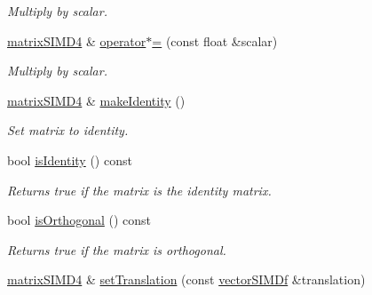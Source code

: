 \begin{DoxyCompactItemize}
\begin{DoxyCompactList}\small\item\em Multiply by scalar. \end{DoxyCompactList}\item 
\hyperlink{classirr_1_1core_1_1matrixSIMD4}{matrix\+S\+I\+M\+D4} \& \hyperlink{classirr_1_1core_1_1matrixSIMD4_a8bee50b9d35327373753850a19047e08}{operator$\ast$=} (const float \&scalar)\hypertarget{classirr_1_1core_1_1matrixSIMD4_a8bee50b9d35327373753850a19047e08}{}\label{classirr_1_1core_1_1matrixSIMD4_a8bee50b9d35327373753850a19047e08}

\begin{DoxyCompactList}\small\item\em Multiply by scalar. \end{DoxyCompactList}\item 
\hyperlink{classirr_1_1core_1_1matrixSIMD4}{matrix\+S\+I\+M\+D4} \& \hyperlink{classirr_1_1core_1_1matrixSIMD4_a9a70b8688d86cb8b872cf1a940283632}{make\+Identity} ()\hypertarget{classirr_1_1core_1_1matrixSIMD4_a9a70b8688d86cb8b872cf1a940283632}{}\label{classirr_1_1core_1_1matrixSIMD4_a9a70b8688d86cb8b872cf1a940283632}

\begin{DoxyCompactList}\small\item\em Set matrix to identity. \end{DoxyCompactList}\item 
bool \hyperlink{classirr_1_1core_1_1matrixSIMD4_a5ec67c604259aadff0a1136310b3859d}{is\+Identity} () const \hypertarget{classirr_1_1core_1_1matrixSIMD4_a5ec67c604259aadff0a1136310b3859d}{}\label{classirr_1_1core_1_1matrixSIMD4_a5ec67c604259aadff0a1136310b3859d}

\begin{DoxyCompactList}\small\item\em Returns true if the matrix is the identity matrix. \end{DoxyCompactList}\item 
bool \hyperlink{classirr_1_1core_1_1matrixSIMD4_a2b22bb3abb4facdd7ba0cd88271332b2}{is\+Orthogonal} () const \hypertarget{classirr_1_1core_1_1matrixSIMD4_a2b22bb3abb4facdd7ba0cd88271332b2}{}\label{classirr_1_1core_1_1matrixSIMD4_a2b22bb3abb4facdd7ba0cd88271332b2}

\begin{DoxyCompactList}\small\item\em Returns true if the matrix is orthogonal. \end{DoxyCompactList}\item 
\hyperlink{classirr_1_1core_1_1matrixSIMD4}{matrix\+S\+I\+M\+D4} \& \hyperlink{classirr_1_1core_1_1matrixSIMD4_a035c181d1853dea8835c7517d999ea24}{set\+Translation} (const \hyperlink{classirr_1_1core_1_1vectorSIMDf}{vector\+S\+I\+M\+Df} \&translation)\hypertarget{classirr_1_1core_1_1matrixSIMD4_a035c181d1853dea8835c7517d999ea24}{}\label{classirr_1_1core_1_1matrixSIMD4_a035c181d1853dea8835c7517d999ea24}


\end{DoxyCompactItemize}
